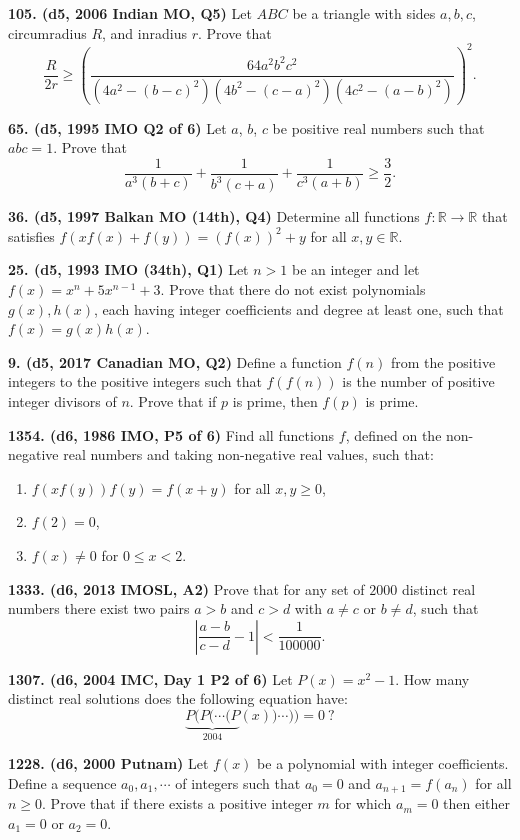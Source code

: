 \documentclass{article}
\begin{document}
\textbf{105. (\color{red}d5\color{black}, 2006 Indian MO, Q5)} Let \(ABC\) be a triangle with sides \(a, b, c\), circumradius \(R\), and inradius \(r\). Prove that
\[\frac{R}{2r} \geq  ( \frac{64a^2b^2c^2}{(4a^2-(b-c)^2)(4b^2-(c-a)^2)(4c^2-(a-b)^2)}  )^2.\]

\textbf{65. (\color{red}d5\color{black}, 1995 IMO Q2 of 6)} Let $a$, $b$, $c$ be positive real numbers such that $abc=1$. Prove that \[\frac{1}{a^3(b+c)} + \frac{1}{b^3(c+a)} + \frac{1}{c^3(a+b)} \geq \frac{3}{2}.\]

\textbf{36. (\color{red}d5\color{black}, 1997 Balkan MO (14th), Q4)} Determine all functions $f : \mathbb{R} \to \mathbb{R}$ that satisfies $f(xf(x) + f(y)) = (f(x))^2 + y$ for all $x,y \in \mathbb{R}$.

\textbf{25. (\color{red}d5\color{black}, 1993 IMO (34th), Q1)} Let $n > 1$ be an integer and let $f(x) = x^n + 5x^{n-1} + 3$. Prove that there do not exist polynomials $g(x),h(x)$, each having integer coefficients and degree at least one, such that $f(x) = g(x)h(x)$.

\textbf{9. (\color{red}d5\color{black}, 2017 Canadian MO, Q2)} Define a function $f(n)$ from the positive integers to the positive integers such that $f(f(n))$ is the number of positive integer divisors of $n$. Prove that if $p$ is prime, then $f(p)$ is prime.

\textbf{1354. (\color{red}d6\color{black}, 1986 IMO, P5 of 6)} Find all functions $f$, defined on the non-negative real numbers and taking non-negative real values, such that: \begin{enumerate} \item $f(xf(y))f(y) = f(x+y)$ for all $x,y\ge 0$, \item $f(2) = 0$, \item $f(x) \neq 0$ for $0\le x < 2$. \end{enumerate}

\textbf{1333. (\color{red}d6\color{black}, 2013 IMOSL, A2)} Prove that for any set of $2000$ distinct real numbers there exist two pairs $a>b$ and $c>d$ with $a\neq c$ or $b\neq d$, such that $$|\frac{a-b}{c-d} - 1 | < \frac{1}{100000}.$$

\textbf{1307. (\color{red}d6\color{black}, 2004 IMC, Day 1 P2 of 6)} Let $P(x)=x^2-1$. How many distinct real solutions does the following equation have: \[\underbrace{P(P(\cdots (P}_{2004}(x))\cdots ))=0\ ?\]

\textbf{1228. (\color{red}d6\color{black}, 2000 Putnam)} Let $f(x)$ be a polynomial with integer coefficients. Define a sequence $a_0 , a_1, \cdots$ of integers such that $a_0 = 0$ and $a_{n+1} = f(a_n)$ for all $n \geq 0$. Prove that if there exists a positive integer $m$ for which $a_m = 0$ then either $a_1 = 0$ or $a_2 = 0$.
\end{document}
